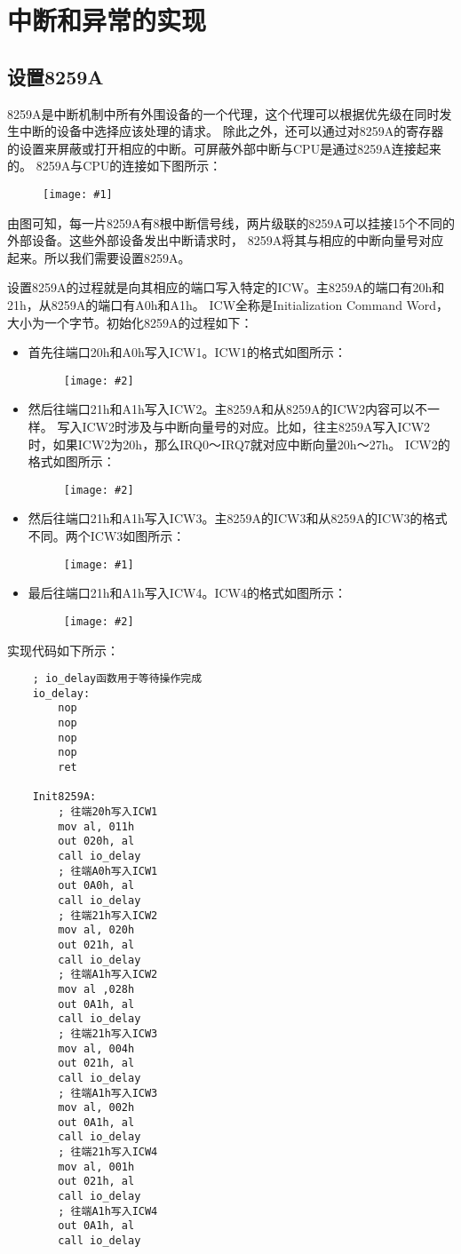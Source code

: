 \documentclass[a4paper,left=2.5cm,right=2.5cm,11pt]{article}
\newcommand{\fic}[1]{\begin{figure}[H]
		\center
		\texttt{[image: \#1]}
	\end{figure}}
\newcommand{\sizedfic}[2]{\begin{figure}[H]
		\center
		\texttt{[image: \#2]}
	\end{figure}}
\begin{document}
\tableofcontents

\clearpage

\section{中断和异常的实现}
\subsection{设置8259A}
	8259A是中断机制中所有外围设备的一个代理，这个代理可以根据优先级在同时发生中断的设备中选择应该处理的请求。
	除此之外，还可以通过对8259A的寄存器的设置来屏蔽或打开相应的中断。可屏蔽外部中断与CPU是通过8259A连接起来的。
	8259A与CPU的连接如下图所示：
	\fic{1.png}

	由图可知，每一片8259A有8根中断信号线，两片级联的8259A可以挂接15个不同的外部设备。这些外部设备发出中断请求时，
	8259A将其与相应的中断向量号对应起来。所以我们需要设置8259A。\par

	设置8259A的过程就是向其相应的端口写入特定的ICW。主8259A的端口有20h和21h，从8259A的端口有A0h和A1h。
	ICW全称是Initialization Command Word，大小为一个字节。初始化8259A的过程如下：
	\begin{itemize}
		\item 首先往端口20h和A0h写入ICW1。ICW1的格式如图所示：
		\sizedfic{0.5}{2.png}
		\item 然后往端口21h和A1h写入ICW2。主8259A和从8259A的ICW2内容可以不一样。
		写入ICW2时涉及与中断向量号的对应。比如，往主8259A写入ICW2时，如果ICW2为20h，那么IRQ0～IRQ7就对应中断向量20h～27h。
		ICW2的格式如图所示：
		\sizedfic{0.4}{3.png}
		\item 然后往端口21h和A1h写入ICW3。主8259A的ICW3和从8259A的ICW3的格式不同。两个ICW3如图所示：
		\fic{4.png}
		\item 最后往端口21h和A1h写入ICW4。ICW4的格式如图所示：
		\sizedfic{0.5}{5.png}
	\end{itemize}

	实现代码如下所示：
	\begin{lstlisting}
	; io_delay函数用于等待操作完成
	io_delay:
		nop
		nop
		nop
		nop
		ret

	Init8259A:
		; 往端20h写入ICW1
		mov al, 011h
		out 020h, al
		call io_delay
		; 往端A0h写入ICW1
		out 0A0h, al
		call io_delay
		; 往端21h写入ICW2
		mov al, 020h
		out 021h, al
		call io_delay
		; 往端A1h写入ICW2
		mov al ,028h
		out 0A1h, al
		call io_delay
		; 往端21h写入ICW3
		mov al, 004h
		out 021h, al
		call io_delay
		; 往端A1h写入ICW3
		mov al, 002h
		out 0A1h, al
		call io_delay
		; 往端21h写入ICW4
		mov al, 001h
		out 021h, al
		call io_delay
		; 往端A1h写入ICW4
		out 0A1h, al
		call io_delay
	\end{lstlisting}
\end{document}
